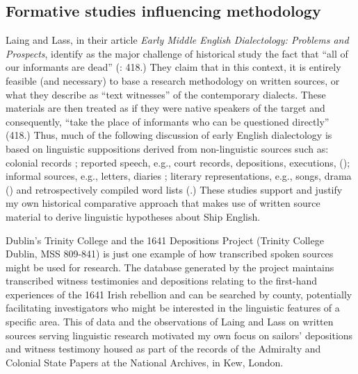 \subsection{{Formative studies influencing methodology}}\label{sec:2.2.2}

Laing and Lass, in their article \textit{Early Middle English Dialectology: Problems and Prospects}, identify as the major challenge of historical  study the fact that “all of our informants are dead” (: 418.) They claim that in this context, it is entirely feasible (and necessary) to base a research methodology on written sources, or what they describe as “text witnesses” of the contemporary dialects. These materials are then treated as if they were native speakers of the target  and consequently, “take the place of informants who can be questioned directly” (418.) Thus, much of the following discussion of early English dialectology is based on linguistic suppositions derived from non-linguistic sources such as: colonial records \citep{Maynor1988}; reported speech, e.g., court records, depositions, executions, (\citealt{Awbery1988,Tagliamonte2013}); informal sources, e.g., letters, diaries \citep{Tagliamonte2013}; literary representations, e.g., songs, drama (\citealt{Russell1883,Wright1967}) and retrospectively compiled word lists (\citealt{Wright1967,Smith1968}.) These studies support and justify my own historical comparative approach that makes use of written source material to derive linguistic hypotheses about Ship English. 

Dublin’s Trinity College and the 1641 Depositions Project (Trinity College Dublin, MSS 809-841) is just one example of how transcribed spoken sources might be used for research. The database generated by the project maintains transcribed witness testimonies and depositions relating to the first-hand experiences of the 1641 Irish rebellion and can be searched by county, potentially facilitating investigators who might be interested in the linguistic features of a specific area. This  of data and the observations of Laing and Lass on written sources serving linguistic research motivated my own focus on sailors’ depositions and witness testimony housed as part of the records of the Admiralty and Colonial State Papers at the National Archives, in Kew, London. 

